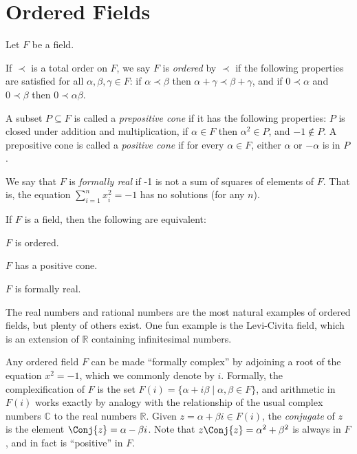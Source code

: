 \documentclass{memoir}
\begin{document}
\setcounter{section}{29}
\section{Ordered Fields}

\begin{dfn}
Let $F$ be a field.
\begin{enumerate*}
\item If $\prec$ is a total order on $F$, we say $F$ is \emph{ordered} by $\prec$ if the following properties are satisfied for all $\alpha,\beta, \gamma \in F$: if $\alpha \prec \beta$ then $\alpha + \gamma \prec \beta + \gamma$, and if $0 \prec \alpha$ and $0 \prec \beta$ then $0 \prec \alpha\beta$.
\item A subset $P \subseteq F$ is called a \emph{prepositive cone} if it has the following properties: $P$ is closed under addition and multiplication, if $\alpha \in F$ then $\alpha^2 \in P$, and $-1 \notin P$. A prepositive cone is called a \emph{positive cone} if for every $\alpha \in F$, either $\alpha$ or $-\alpha$ is in $P$.
\item We say that $F$ is \emph{formally real} if -1 is not a sum of squares of elements of $F$. That is, the equation $\sum_{i=1}^n x_i^2 = -1$ has no solutions (for any $n$).
\end{enumerate*}
\end{dfn}

\begin{prp}
If $F$ is a field, then the following are equivalent:
\begin{enumerate*}
\item $F$ is ordered.
\item $F$ has a positive cone.
\item $F$ is formally real.
\end{enumerate*}
\end{prp}

The real numbers and rational numbers are the most natural examples of ordered fields, but plenty of others exist. One fun example is the Levi-Civita field, which is an extension of $\mathbb{R}$ containing infinitesimal numbers. 

Any ordered field $F$ can be made ``formally complex'' by adjoining a root of the equation $x^2 = -1$, which we commonly denote by $i$. Formally, the complexification of $F$ is the set $F(i) = \{\alpha + i \beta \mid \alpha,\beta \in F\}$, and arithmetic in $F(i)$ works exactly by analogy with the relationship of the usual complex numbers $\mathbb{C}$ to the real numbers $\mathbb{R}$. Given $z = \alpha + \beta i \in F(i)$, the \emph{conjugate} of $z$ is the element $\Conj{z} = \alpha - \beta i$. Note that $z \Conj{z} = \alpha^2 + \beta^2$ is always in $F$, and in fact is ``positive'' in $F$.
\end{document}
